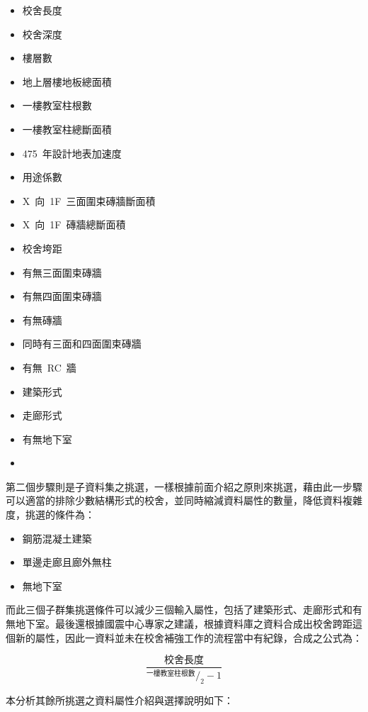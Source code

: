 \begin{multicols}{2}
\begin{itemize}
\item 校舍長度
\item 校舍深度
\item 樓層數
\item 地上層樓地板總面積
\item 一樓教室柱根數
\item 一樓教室柱總斷面積
\item 475~年設計地表加速度
\item 用途係數
\item X~向~1F~三面圍束磚牆斷面積
\item X~向~1F~磚牆總斷面積
\item 校舍垮距
\item 有無三面圍束磚牆
\item 有無四面圍束磚牆
\item 有無磚牆
\item 同時有三面和四面圍束磚牆
\item 有無~RC~牆
\item 建築形式
\item 走廊形式
\item 有無地下室
\item[]
\end{itemize}
\end{multicols}

第二個步驟則是子資料集之挑選，一樣根據前面介紹之原則來挑選，藉由此一步驟可以適當的排除少數結構形式的校舍，並同時縮減資料屬性的數量，降低資料複雜度，挑選的條件為：

\begin{itemize}
\item 鋼筋混凝土建築
\item 單邊走廊且廊外無柱
\item 無地下室
\end{itemize}

而此三個子群集挑選條件可以減少三個輸入屬性，包括了建築形式、走廊形式和有無地下室。最後還根據國震中心專家之建議，根據資料庫之資料合成出校舍跨距這個新的屬性，因此一資料並未在校舍補強工作的流程當中有紀錄，合成之公式為：

\begin{equation} \dfrac{\text{校舍長度}}{^{\text{一樓教室柱根數}}/_2 - 1} \label{eq:span}\end{equation} 

本分析其餘所挑選之資料屬性介紹與選擇說明如下：

